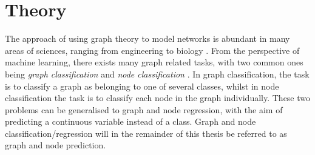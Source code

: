 \chapter{Theory}
\label{chap:theory}

The approach of using graph theory to model networks is abundant in many areas of sciences, ranging from engineering to biology \cite{network_science_chap1}. From the perspective of machine learning, there exists many graph related tasks, with two common ones being \textit{graph classification} and \textit{node classification} \cite{quadratic_graph_classification, active_learning_node_classification}. In graph classification, the task is to classify a graph as belonging to one of several classes, whilst in node classification the task is to classify each node in the graph individually. These two problems can be generalised to graph and node regression, with the aim of predicting a continuous variable instead of a class. Graph and node classification/regression will in the remainder of this thesis be referred to as graph and node prediction. 
%         

